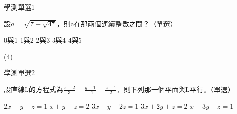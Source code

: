\begin{QUESTIONS}
    \begin{QUESTION}
        \begin{ExamInfo}{83}{學測}{單選}{1}
        \end{ExamInfo}
        \begin{ExamAnsRateInfo}{}{}{}{}
        \end{ExamAnsRateInfo}
        \begin{QBODY}
            設$a=\sqrt{7+\sqrt{47}}$，則a在那兩個連續整數之間？（單選）
            \begin{QOPS}
                \QOP 0與1
                \QOP 1與2
                \QOP 2與3
                \QOP 3與4
                \QOP 4與5
            \end{QOPS}            
        \end{QBODY}
        \begin{QFROMS}
        \end{QFROMS}
        \begin{QTAGS}\end{QTAGS}
        \begin{QANS}
            (4)
        \end{QANS}
        \begin{QSOLLIST}
        \end{QSOLLIST}
        \begin{QEMPTYSPACE}
        \end{QEMPTYSPACE}
    \end{QUESTION}
    \begin{QUESTION}
        \begin{ExamInfo}{83}{學測}{單選}{2}
        \end{ExamInfo}
        \begin{ExamAnsRateInfo}{}{}{}{}
        \end{ExamAnsRateInfo}
        \begin{QBODY}
            設直線L的方程式為$\frac{x-2}{3}=\frac{y+1}{-1}=\frac{z-1}{2}$，則下列那一個平面與L平行。（單選）
            \begin{QOPS}
                \QOP $2x-y+z=1$
                \QOP $x+y-z=2$
                \QOP $3x-y+2z=1$
                \QOP $3x+2y+z=2$
                \QOP $x-3y+z=1$    
            \end{QOPS}        
        \end{QBODY}
        \begin{QFROMS}
        \end{QFROMS}

\end{QUESTION}
\end{QUESTIONS}
